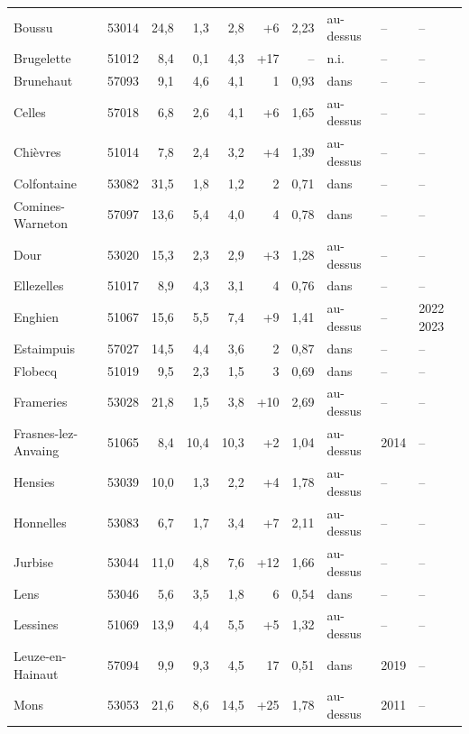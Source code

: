 \begin{longtable}{lrrrrrrlll}
Boussu & 53014 & 24{,}8 & 1{,}3 & 2{,}8 & +6 & 2{,}23 & au-dessus & -- & -- \\
Brugelette & 51012 & 8{,}4 & \textminus{}0{,}1 & 4{,}3 & +17 & -- & n.i. & -- & -- \\
Brunehaut & 57093 & 9{,}1 & 4{,}6 & 4{,}1 & \textminus{}1 & 0{,}93 & dans & -- & -- \\
Celles & 57018 & 6{,}8 & 2{,}6 & 4{,}1 & +6 & 1{,}65 & au-dessus & -- & -- \\
Chièvres & 51014 & 7{,}8 & 2{,}4 & 3{,}2 & +4 & 1{,}39 & au-dessus & -- & -- \\
Colfontaine & 53082 & 31{,}5 & 1{,}8 & 1{,}2 & \textminus{}2 & 0{,}71 & dans & -- & -- \\
Comines-Warneton & 57097 & 13{,}6 & 5{,}4 & 4{,}0 & \textminus{}4 & 0{,}78 & dans & -- & -- \\
Dour & 53020 & 15{,}3 & 2{,}3 & 2{,}9 & +3 & 1{,}28 & au-dessus & -- & -- \\
Ellezelles & 51017 & 8{,}9 & 4{,}3 & 3{,}1 & \textminus{}4 & 0{,}76 & dans & -- & -- \\
Enghien & 51067 & 15{,}6 & 5{,}5 & 7{,}4 & +9 & 1{,}41 & au-dessus & -- & 2022 2023 \\
Estaimpuis & 57027 & 14{,}5 & 4{,}4 & 3{,}6 & \textminus{}2 & 0{,}87 & dans & -- & -- \\
Flobecq & 51019 & 9{,}5 & 2{,}3 & 1{,}5 & \textminus{}3 & 0{,}69 & dans & -- & -- \\
Frameries & 53028 & 21{,}8 & 1{,}5 & 3{,}8 & +10 & 2{,}69 & au-dessus & -- & -- \\
Frasnes-lez-Anvaing & 51065 & 8{,}4 & 10{,}4 & 10{,}3 & +2 & 1{,}04 & au-dessus & 2014 & -- \\
Hensies & 53039 & 10{,}0 & 1{,}3 & 2{,}2 & +4 & 1{,}78 & au-dessus & -- & -- \\
Honnelles & 53083 & 6{,}7 & 1{,}7 & 3{,}4 & +7 & 2{,}11 & au-dessus & -- & -- \\
Jurbise & 53044 & 11{,}0 & 4{,}8 & 7{,}6 & +12 & 1{,}66 & au-dessus & -- & -- \\
Lens & 53046 & 5{,}6 & 3{,}5 & 1{,}8 & \textminus{}6 & 0{,}54 & dans & -- & -- \\
Lessines & 51069 & 13{,}9 & 4{,}4 & 5{,}5 & +5 & 1{,}32 & au-dessus & -- & -- \\
Leuze-en-Hainaut & 57094 & 9{,}9 & 9{,}3 & 4{,}5 & \textminus{}17 & 0{,}51 & dans & 2019 & -- \\
Mons & 53053 & 21{,}6 & 8{,}6 & 14{,}5 & +25 & 1{,}78 & au-dessus & 2011 & -- \\

\end{longtable}
